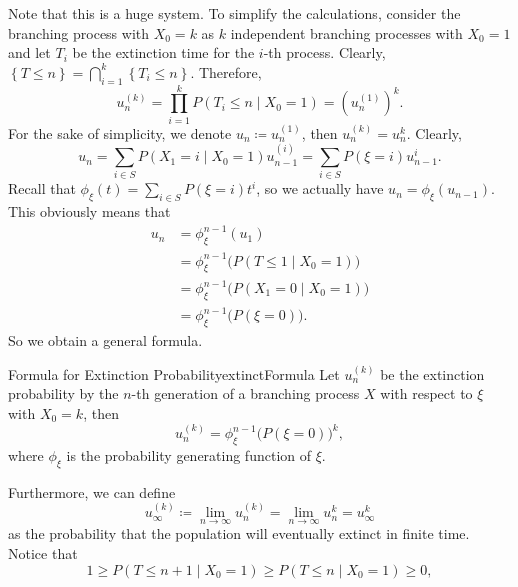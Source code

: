 \documentclass[math, code]{amznotes}
\theoremstyle{remark}
\begin{document}
Note that this is a huge system. To simplify the calculations, consider the branching process with $X_0 = k$ as $k$ independent branching processes with $X_0 = 1$ and let $T_i$ be the extinction time for the $i$-th process. Clearly, $\left\{T \leq n\right\} = \bigcap_{i = 1}^k\left\{T_i \leq n\right\}$. Therefore, 
\begin{equation*}
    u_n^{(k)} = \prod_{i = 1}^kP\left(T_i \leq n \mid X_0 = 1\right) = \left(u_n^{(1)}\right)^k.
\end{equation*}
For the sake of simplicity, we denote $u_n \coloneqq u_n^{(1)}$, then $u_n^{(k)} = u_n^k$. Clearly,
\begin{equation*}
    u_n = \sum_{i \in S}P\left(X_1 = i \mid X_0 = 1\right)u_{n - 1}^{(i)} = \sum_{i \in S}P\left(\xi = i\right)u_{n - 1}^i.
\end{equation*}
Recall that $\phi_{\xi}\left(t\right) = \sum_{i \in S}P\left(\xi = i\right)t^i$, so we actually have $u_n = \phi_{\xi}\left(u_{n - 1}\right)$. This obviously means that 
\begin{align*}
    u_n & = \phi^{n - 1}_{\xi}\left(u_1\right) \\
    & = \phi^{n - 1}_{\xi}\bigl(P\left(T \leq 1 \mid X_0 = 1\right)\bigr) \\
    & = \phi^{n - 1}_{\xi}\bigl(P\left(X_1 = 0 \mid X_0 = 1\right)\bigr) \\
    & = \phi^{n - 1}_{\xi}\bigl(P\left(\xi = 0\right)\bigr).
\end{align*}
So we obtain a general formula.
\begin{probox}{Formula for Extinction Probability}{extinctFormula}
    Let $u_n^{(k)}$ be the extinction probability by the $n$-th generation of a branching process $X$ with respect to $\xi$ with $X_0 = k$, then
    \begin{equation*}
        u_n^{(k)} = \phi^{n - 1}_{\xi}\bigl(P\left(\xi = 0\right)\bigr)^k,
    \end{equation*}
    where $\phi_{\xi}$ is the probability generating function of $\xi$.
\end{probox}
Furthermore, we can define 
\begin{equation*}
    u_{\infty}^{(k)} \coloneqq \lim_{n \to \infty}u_n^{(k)} = \lim_{n \to \infty}u_n^{k} = u_{\infty}^k
\end{equation*}
as the probability that the population will eventually extinct in finite time. Notice that 
\begin{equation*}
    1 \geq P\left(T \leq n + 1 \mid X_0 = 1\right) \geq P\left(T \leq n \mid X_0 = 1\right) \geq 0,
\end{equation*}
\end{document}
